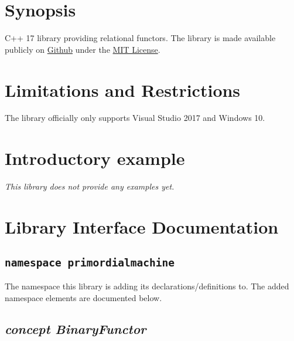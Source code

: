 \documentclass[oneside]{book}
\begin{document}
\frontmatter

\begin{titlepage}
\maketitle
\end{titlepage}

\tableofcontents
{}

\mainmatter

\chapter{Synopsis}
C++ 17 library providing relational functors.
The library is made available publicly on
\href{\GetLibraryRepository}{Github}
under the
\href{\GetLibraryRepository/blob/master/LICENSE}{MIT License}.

\chapter{Limitations and Restrictions}
The library officially only supports Visual Studio 2017 and Windows 10.

\chapter{Introductory example}
\textit{\color{orange}This library does not provide any examples yet.}



\chapter{Library Interface Documentation}

\section{\texttt{namespace primordialmachine}}
The namespace this library is adding its declarations/definitions to.
The added namespace elements are documented below.



\section{\textit{concept BinaryFunctor}}
\end{document}
